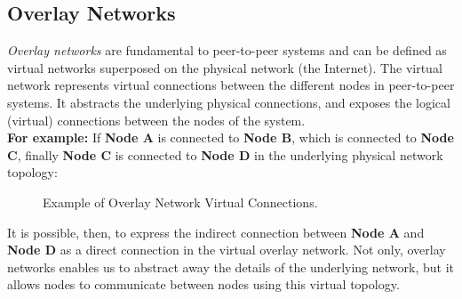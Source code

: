 \documentclass[12pt, titlepage]{uo_temp}
\begin{document}
   
     \subsection{Overlay Networks}\label{bkg_overlay}
     \emph{Overlay networks} are fundamental to peer-to-peer systems and can be defined as
     virtual networks superposed on the physical network (the Internet).  The virtual
     network represents virtual connections between the different nodes in peer-to-peer
     systems.  It abstracts the underlying physical connections, and exposes the logical
     (virtual) connections between the nodes of the system.\\

     \textbf{For example:} 
     If \textbf{Node A} is connected to \textbf{Node B}, which is
     connected to \textbf{Node C}, finally \textbf{Node C} is connected to \textbf{Node D}
     in the underlying physical network topology:

     \begin{figure}[h]
       \caption{Example of Overlay Network Virtual Connections.}
     \end{figure}

     It is possible, then, to express the indirect connection between \textbf{Node A} and
     \textbf{Node D} as a direct connection in the virtual overlay network. Not only,
     overlay networks enables us to abstract away the details of the underlying network,
     but it allows nodes to communicate between nodes using this virtual topology.  
\end{document}

